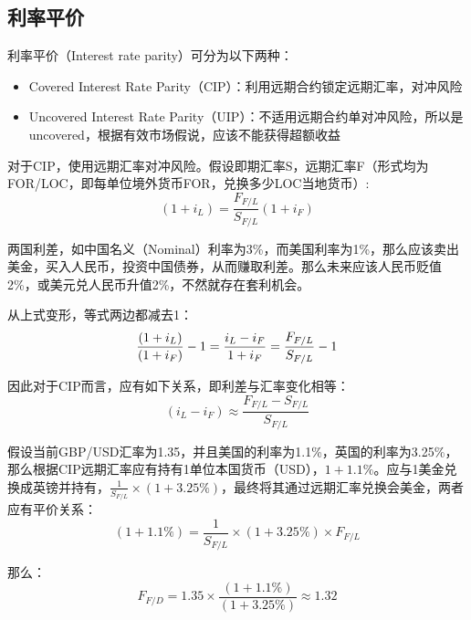 \documentclass[11pt]{article}
\begin{document}
\begin{appendices}
\section{利率平价}

利率平价（Interest rate parity）可分为以下两种：
\begin{itemize}
    \item Covered Interest Rate Parity（CIP）：利用远期合约锁定远期汇率，对冲风险
    \item Uncovered Interest Rate Parity（UIP）：不适用远期合约单对冲风险，所以是uncovered，根据有效市场假说，应该不能获得超额收益
\end{itemize}

对于CIP，使用远期汇率对冲风险。假设即期汇率S，远期汇率F（形式均为FOR/LOC，即每单位境外货币FOR，兑换多少LOC当地货币）:
\begin{equation*}
    (1 + i_{L}) = \frac{F_{F/L}}{S_{F/L}} (1+ i_{F})
\end{equation*}

两国利差，如中国名义（Nominal）利率为3\%，而美国利率为1\%，那么应该卖出美金，买入人民币，投资中国债券，从而赚取利差。那么未来应该人民币贬值2\%，或美元兑人民币升值2\%，不然就存在套利机会。

从上式变形，等式两边都减去1：
\begin{equation*}
    \frac{(1 + i_{L})}{(1+ i_{F})} - 1 = \frac{i_L-i_F}{1+i_F} = \frac{F_{F/L}}{S_{F/L}} - 1 \\
\end{equation*}

因此对于CIP而言，应有如下关系，即利差与汇率变化相等：
\begin{equation*}
    (i_{L}-i_{F}) \approx \frac{F_{F/L}-S_{F/L}}{S_{F/L}}
\end{equation*}

\begin{example}
    假设当前GBP/USD汇率为1.35，并且美国的利率为1.1\%，英国的利率为3.25\%，那么根据CIP远期汇率应有持有1单位本国货币（USD），$1+1.1\%$。应与1美金兑换成英镑并持有，$\tfrac{1}{S_{F/L}} \times (1+3.25\%)$，最终将其通过远期汇率兑换会美金，两者应有平价关系：
    \begin{equation*}
        (1+1.1\%) = \frac{1}{S_{F/L}} \times (1+3.25\%) \times F_{F/L}
    \end{equation*}

    那么：
    \begin{equation*}
        F_{F/D} = 1.35 \times \frac{(1+1.1\%)}{(1+3.25\%)} \approx 1.32
    \end{equation*}
\end{example}


\end{appendices}
\end{document}

